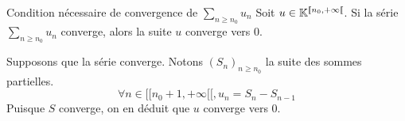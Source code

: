 \documentclass{article}
\date{30 juin 2024}
\begin{document}
\maketitle

\begin{question_kholle}{Condition nécessaire de convergence de $\sum_{n \geqslant n_0} u_n$}
	Soit $u \in \mathbb K^{[ \! [ n_{0}, + \infty [ \![}$.
	Si la série $\sum_{n\geqslant n_{0}}u_{n}$ converge, alors la suite $u$ converge vers $0$.

	Supposons que la série converge. Notons $(S_{n})_{n\geqslant n_{0}}$ la suite des sommes partielles.
	$$\forall n \in [ \! [ n_{0}+1, +\infty [ \![, u_{n} = S_{n} - S_{n-1}$$
	Puisque $S$ converge, on en déduit que $u$ converge vers $0$.
\end{question_kholle}
\end{document}
